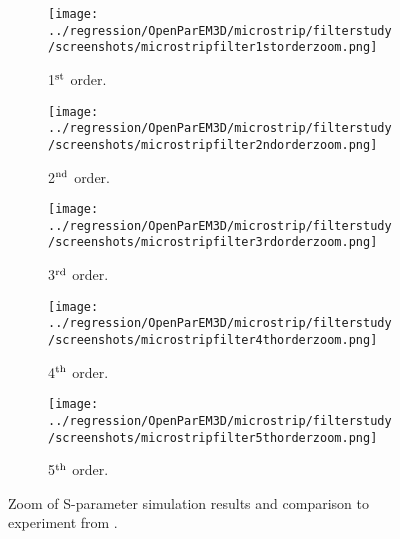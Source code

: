 \documentclass[titlepage]{article}
\renewcommand\_{\textunderscore\linebreak[1]}
\begin{document}
\begin{figure}[p]
  \centering
  \begin{subfigure}{0.45\textwidth}
     \texttt{[image: ../regression/OpenParEM3D/microstrip/filter\_study/screenshots/microstrip\_filter\_1st\_order\_zoom.png]}
     \caption{1$^{\textnormal{st}}$ order.}
  \end{subfigure}
  \begin{subfigure}{0.45\textwidth}
     \texttt{[image: ../regression/OpenParEM3D/microstrip/filter\_study/screenshots/microstrip\_filter\_2nd\_order\_zoom.png]}
     \caption{2$^{\textnormal{nd}}$ order.}
  \end{subfigure}
  \begin{subfigure}{0.45\textwidth}
     \texttt{[image: ../regression/OpenParEM3D/microstrip/filter\_study/screenshots/microstrip\_filter\_3rd\_order\_zoom.png]}
     \caption{3$^{\textnormal{rd}}$ order.}
  \end{subfigure}
  \begin{subfigure}{0.45\textwidth}
     \texttt{[image: ../regression/OpenParEM3D/microstrip/filter\_study/screenshots/microstrip\_filter\_4th\_order\_zoom.png]}
     \caption{4$^{\textnormal{th}}$ order.}
  \end{subfigure}
  \par\bigskip
  \begin{subfigure}{0.72\textwidth}
     \texttt{[image: ../regression/OpenParEM3D/microstrip/filter\_study/screenshots/microstrip\_filter\_5th\_order\_zoom.png]}
     \caption{5$^{\textnormal{th}}$ order.}
  \end{subfigure}
  \caption{Zoom of S-parameter simulation results and comparison to experiment from \cite{Weng}.}
  \label{fig:filter_results_zoom}
\end{figure}
\end{document}
